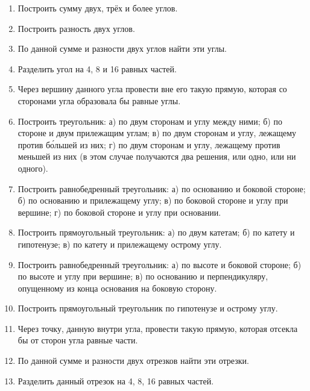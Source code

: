 \documentclass[twoside]{book}
\begin{document}
\begin{enumerate}[resume]

 \item
Построить сумму двух, трёх и более углов.

 \item
Построить разность двух углов.

 \item
По данной сумме и разности двух углов найти эти углы.

 \item
Разделить угол на 4, 8 и 16 равных частей.

 \item
Через вершину данного угла провести вне его такую прямую, которая со сторонами угла образовала бы равные углы.

 \item
Построить треугольник:
а) по двум сторонам и углу между ними;
б) по стороне и двум прилежащим углам;
в) по двум сторонам и углу, лежащему против б\'{о}льшей из них;
г) по двум сторонам и углу, лежащему против меньшей из них (в этом случае получаются два решения, или одно, или ни одного).

 \item
Построить равнобедренный треугольник:
а) по основанию и боковой стороне;
б) по основанию и прилежащему углу;
в) по боковой стороне и углу при вершине;
г) по боковой стороне и углу при основании.

 \item
Построить прямоугольный треугольник:
а) по двум катетам;
б) по катету и гипотенузе;
в) по катету и прилежащему острому углу.

 \item
Построить равнобедренный треугольник:
а) по высоте и боковой стороне;
б) по высоте и углу при вершине;
в) по основанию и перпендикуляру, опущенному из конца основания на боковую сторону.

 \item
Построить прямоугольный треугольник по гипотенузе и острому углу.

 \item
Через точку, данную внутри угла, провести такую прямую, которая отсекла бы от сторон угла равные части.

 \item
По данной сумме и разности двух отрезков найти эти отрезки.

 \item
Разделить данный отрезок на 4, 8, 16 равных частей.


\end{enumerate}
\end{document}

